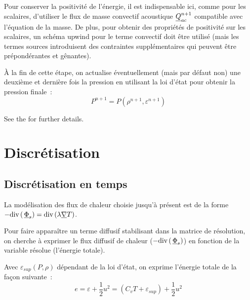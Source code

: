 Pour conserver la positivit\'e de l'\'energie, il est indispensable ici,
comme pour les scalaires, d'utiliser le flux de masse convectif acoustique
$\underline{Q}_{ac}^{n+1}$ compatible avec l'\'equation de la masse.
De plus, pour obtenir des propri\'et\'es de positivit\'e sur les scalaires,
un sch\'ema upwind pour le terme convectif doit \^etre utilis\'e
(mais les termes sources introduisent des contraintes suppl\'ementaires
qui peuvent \^etre pr\'epond\'erantes et g\^enantes).

\vspace{0.5cm}

\`A la fin de cette \'etape, on actualise éventuellement
(mais par défaut non)
une deuxi\`eme et derni\`ere fois la pression
en utilisant la loi d'\'etat pour obtenir la pression finale~:
\begin{equation}
\displaystyle P^{n+1}=P(\rho^{n+1},\varepsilon^{n+1})
\end{equation}

See the  for further details.

\section*{Discr\'etisation}

\subsection*{Discr\'etisation en temps}

La mod\'elisation des flux de chaleur choisie jusqu'\`a pr\'esent est de la
forme $-\text{div}\,(\,\underline{\Phi}_s) = \text{div}\,(\lambda \underline{\nabla}{T})$.

Pour faire appara\^itre un terme diffusif stabilisant dans la
matrice de r\'esolution, on cherche \`a exprimer le flux diffusif de chaleur
($-\text{div}\,(\,\underline{\Phi}_s)$)
en fonction de la variable r\'esolue (l'\'energie totale).

Avec $\varepsilon_{sup}(P,\rho)$
d\'ependant de la loi d'\'etat, on exprime l'\'energie totale de la fa\c con suivante~:
\begin{equation}
e = \varepsilon + \frac{1}{2} u^2
= (C_v T + \varepsilon_{sup}) + \frac{1}{2} u^2
\end{equation}

